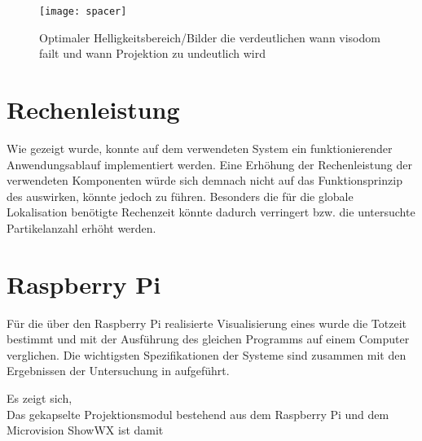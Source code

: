 \begin{figure}[!ht]
	\begin{center}
		\texttt{[image: spacer]}
		\caption{Optimaler Helligkeitsbereich/Bilder die verdeutlichen wann visodom failt und wann Projektion zu undeutlich wird}
		\label{fig.optlight}
	\end{center}
\end{figure}


\section{Rechenleistung}
Wie gezeigt wurde, konnte auf dem verwendeten System ein funktionierender Anwendungsablauf implementiert werden. Eine Erhöhung der Rechenleistung der verwendeten Komponenten würde sich demnach nicht auf das Funktionsprinzip des  auswirken, könnte jedoch zu  führen. Besonders die für die globale Lokalisation benötigte Rechenzeit könnte dadurch verringert bzw. die untersuchte Partikelanzahl erhöht werden.\\

\section{Raspberry Pi}
Für die über den Raspberry Pi realisierte Visualisierung eines  wurde die Totzeit bestimmt und mit der Ausführung des gleichen Programms auf einem Computer verglichen. Die wichtigsten Spezifikationen der Systeme sind zusammen mit den Ergebnissen der Untersuchung in  aufgeführt.

\red[TABELLE!]

Es zeigt sich, \red[TODO]\\
Das gekapselte Projektionsmodul bestehend aus dem Raspberry Pi und dem Microvision ShowWX ist damit \\



